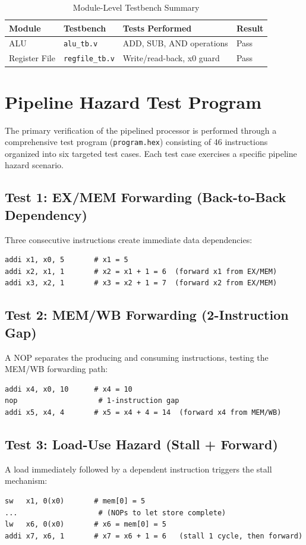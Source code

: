 \documentclass[12pt,a4paper]{report}
\begin{document}
\begin{table}[H]
\centering
\caption{Module-Level Testbench Summary}
\label{tab:testbenches}
\begin{tabular}{L{2.4cm} L{2.8cm} L{5.8cm} C{1.6cm}}
    \toprule
    \textbf{Module} & \textbf{Testbench} & \textbf{Tests Performed} & \textbf{Result} \\
    \midrule
    ALU           & \texttt{alu\_tb.v}     & ADD, SUB, AND operations    & Pass \\
    Register File & \texttt{regfile\_tb.v} & Write/read-back, x0 guard  & Pass \\
    \bottomrule
\end{tabular}
\end{table}

\section{Pipeline Hazard Test Program}
The primary verification of the pipelined processor is performed through a
comprehensive test program (\texttt{program.hex}) consisting of 46 instructions
organized into six targeted test cases. Each test case exercises a specific pipeline
hazard scenario.

\subsection{Test 1: EX/MEM Forwarding (Back-to-Back Dependency)}
Three consecutive instructions create immediate data dependencies:
\begin{lstlisting}[style=console]
addi x1, x0, 5       # x1 = 5
addi x2, x1, 1       # x2 = x1 + 1 = 6  (forward x1 from EX/MEM)
addi x3, x2, 1       # x3 = x2 + 1 = 7  (forward x2 from EX/MEM)
\end{lstlisting}

\subsection{Test 2: MEM/WB Forwarding (2-Instruction Gap)}
A NOP separates the producing and consuming instructions, testing the MEM/WB
forwarding path:
\begin{lstlisting}[style=console]
addi x4, x0, 10      # x4 = 10
nop                   # 1-instruction gap
addi x5, x4, 4       # x5 = x4 + 4 = 14  (forward x4 from MEM/WB)
\end{lstlisting}

\subsection{Test 3: Load-Use Hazard (Stall + Forward)}
A load immediately followed by a dependent instruction triggers the stall mechanism:
\begin{lstlisting}[style=console]
sw   x1, 0(x0)       # mem[0] = 5
...                   # (NOPs to let store complete)
lw   x6, 0(x0)       # x6 = mem[0] = 5
addi x7, x6, 1       # x7 = x6 + 1 = 6   (stall 1 cycle, then forward)
\end{lstlisting}
\end{document}
